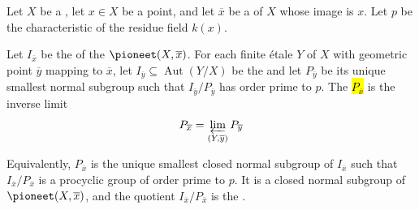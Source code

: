 \begin{definition} \label{definition:wild_inertia_subgroup_of_etale_fundamental_group_of_connected_scheme_at_geometric_point}
    Let $X$ be a  , let $x \in X$ be a point, and let $\overline{x}$ be a  of $X$ whose image is $x$. Let $p$ be the characteristic of the residue field $k(x)$.

    Let $I_{\overline{x}}$ be the  of the  $\pioneet(X, \overline{x})$.
    For each finite \'etale  $Y$ of $X$ with geometric point $\overline{y}$ mapping to $\overline{x}$, let $I_{\overline{y}} \subseteq \operatorname{Aut}(Y/X)$ be the  and let $P_{\overline{y}}$ be its unique smallest normal subgroup such that $I_{\overline{y}}/P_{\overline{y}}$ has order prime to $p$.
    The  \hl{$P_{\overline{x}}$} is the inverse limit
    $$P_{\overline{x}} = \varprojlim_{(Y, \overline{y})} P_{\overline{y}}$$

    Equivalently, $P_{\overline{x}}$ is the unique smallest closed normal subgroup of $I_{\overline{x}}$ such that $I_{\overline{x}}/P_{\overline{x}}$ is a procyclic group of order prime to $p$. It is a closed normal subgroup of $\pioneet(X, \overline{x})$, and the quotient $I_{\overline{x}}/P_{\overline{x}}$ is the .
\end{definition}
